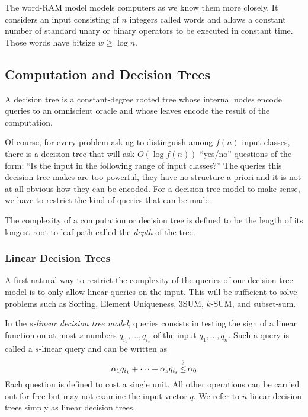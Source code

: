 The word-RAM model models computers as we know them more closely. It considers
an input consisting of \(n\) integers called words and allows a constant number
of standard unary or binary operators to be executed in constant time. Those
words have bitsize \(w \geq \log n\).

\subsection{Computation and Decision Trees}

A decision tree is a constant-degree rooted tree whose internal nodes encode
queries to an omniscient oracle and whose leaves encode the result of the
computation.

Of course, for every problem asking to distinguish among \(f(n)\) input
classes, there is a decision tree that will ask \(O(\log f(n))\)
``yes/no'' questions of
the form: ``Is the input in the following range of input classes?''
The queries this decision tree makes are too powerful, they have no
structure a priori and it is not at all obvious how they can be encoded.
For a decision tree model to make sense, we have to restrict the kind of
queries that can be made.

The complexity of a computation or decision tree is defined to be the length of
its longest root to leaf path called the \emph{depth} of the tree.

\subsubsection{Linear Decision Trees}

A first natural way to restrict the complexity of the queries of our decision
tree model is to only allow linear queries on the input. This will be
sufficient to solve problems such as Sorting, Element Uniqueness, 3SUM,
\(k\)-SUM, and subset-sum.

In the \emph{\(s\)-linear decision tree model}, queries consists
in testing the sign of a linear function on at most \(s\) numbers \(q_{i_1},\ldots,q_{i_s}\) of the
input \(q_1,\ldots,q_n\). Such a query is called a \(s\)-linear query and
can be written as
%
\begin{displaymath}
	\alpha_1 q_{i_1} + \cdots + \alpha_s q_{i_s} \mathop{\leq}^{?} \alpha_0
\end{displaymath}
%
Each question is defined to cost a single unit. All other operations can be
carried out for free but may not examine the input vector $q$. We refer to
$n$-linear decision trees simply as linear decision trees.

